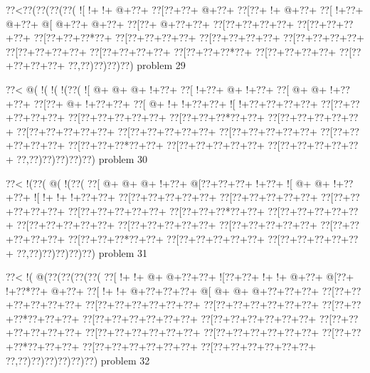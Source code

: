 \vbox{\vbox{\goo
\0??<\0??(\0??(\0??(\0??(
\- ![\- !+\- !+\- @+\0??+
\0??[\0??+\0??+\- @+\0??+
\0??[\0??+\- !+\- @+\0??+
\0??[\- !+\0??+\- @+\0??+
\- @[\- @+\0??+\- @+\0??+
\0??[\0??+\- @+\0??+\0??+
\0??[\0??+\0??+\0??+\0??+
\0??[\0??+\0??+\0??+\0??+
\0??[\0??+\0??+\0??*\0??+
\0??[\0??+\0??+\0??+\0??+
\0??[\0??+\0??+\0??+\0??+
\0??[\0??+\0??+\0??+\0??+
\0??[\0??+\0??+\0??+\0??+
\0??[\0??+\0??+\0??+\0??+
\0??[\0??+\0??+\0??*\0??+
\0??[\0??+\0??+\0??+\0??+
\0??[\0??+\0??+\0??+\0??+
\0??,\0??)\0??)\0??)\0??)
}
\hfil problem 29\hfil\break
}

\vbox{\vbox{\goo
\0??<\- @(\- !(\- !(\- !(\0??(
\- ![\- @+\- @+\- @+\- !+\0??+
\0??[\- !+\0??+\- @+\- !+\0??+
\0??[\- @+\- @+\- !+\0??+\0??+
\0??[\0??+\- @+\- !+\0??+\0??+
\0??[\- @+\- !+\- !+\0??+\0??+
\- ![\- !+\0??+\0??+\0??+\0??+
\0??[\0??+\0??+\0??+\0??+\0??+
\0??[\0??+\0??+\0??+\0??+\0??+
\0??[\0??+\0??+\0??*\0??+\0??+
\0??[\0??+\0??+\0??+\0??+\0??+
\0??[\0??+\0??+\0??+\0??+\0??+
\0??[\0??+\0??+\0??+\0??+\0??+
\0??[\0??+\0??+\0??+\0??+\0??+
\0??[\0??+\0??+\0??+\0??+\0??+
\0??[\0??+\0??+\0??*\0??+\0??+
\0??[\0??+\0??+\0??+\0??+\0??+
\0??[\0??+\0??+\0??+\0??+\0??+
\0??,\0??)\0??)\0??)\0??)\0??)
}
\hfil problem 30\hfil\break
}

\vbox{\vbox{\goo
\0??<\- !(\0??(\- @(\- !(\0??(
\0??[\- @+\- @+\- @+\- !+\0??+
\- @[\0??+\0??+\0??+\- !+\0??+
\- ![\- @+\- @+\- !+\0??+\0??+
\- ![\- !+\- !+\- !+\0??+\0??+
\0??[\0??+\0??+\0??+\0??+\0??+
\0??[\0??+\0??+\0??+\0??+\0??+
\0??[\0??+\0??+\0??+\0??+\0??+
\0??[\0??+\0??+\0??+\0??+\0??+
\0??[\0??+\0??+\0??*\0??+\0??+
\0??[\0??+\0??+\0??+\0??+\0??+
\0??[\0??+\0??+\0??+\0??+\0??+
\0??[\0??+\0??+\0??+\0??+\0??+
\0??[\0??+\0??+\0??+\0??+\0??+
\0??[\0??+\0??+\0??+\0??+\0??+
\0??[\0??+\0??+\0??*\0??+\0??+
\0??[\0??+\0??+\0??+\0??+\0??+
\0??[\0??+\0??+\0??+\0??+\0??+
\0??,\0??)\0??)\0??)\0??)\0??)
}
\hfil problem 31\hfil\break
}

\vbox{\vbox{\goo
\0??<\- !(\- @(\0??(\0??(\0??(\0??(
\0??[\- !+\- !+\- @+\- @+\0??+\0??+
\- ![\0??+\0??+\- !+\- !+\- @+\0??+
\- @[\0??+\- !+\0??*\0??+\- @+\0??+
\0??[\- !+\- !+\- @+\0??+\0??+\0??+
\- @[\- @+\- @+\- @+\0??+\0??+\0??+
\0??[\0??+\0??+\0??+\0??+\0??+\0??+
\0??[\0??+\0??+\0??+\0??+\0??+\0??+
\0??[\0??+\0??+\0??+\0??+\0??+\0??+
\0??[\0??+\0??+\0??*\0??+\0??+\0??+
\0??[\0??+\0??+\0??+\0??+\0??+\0??+
\0??[\0??+\0??+\0??+\0??+\0??+\0??+
\0??[\0??+\0??+\0??+\0??+\0??+\0??+
\0??[\0??+\0??+\0??+\0??+\0??+\0??+
\0??[\0??+\0??+\0??+\0??+\0??+\0??+
\0??[\0??+\0??+\0??*\0??+\0??+\0??+
\0??[\0??+\0??+\0??+\0??+\0??+\0??+
\0??[\0??+\0??+\0??+\0??+\0??+\0??+
\0??,\0??)\0??)\0??)\0??)\0??)\0??)
}
\hfil problem 32\hfil\break
}

